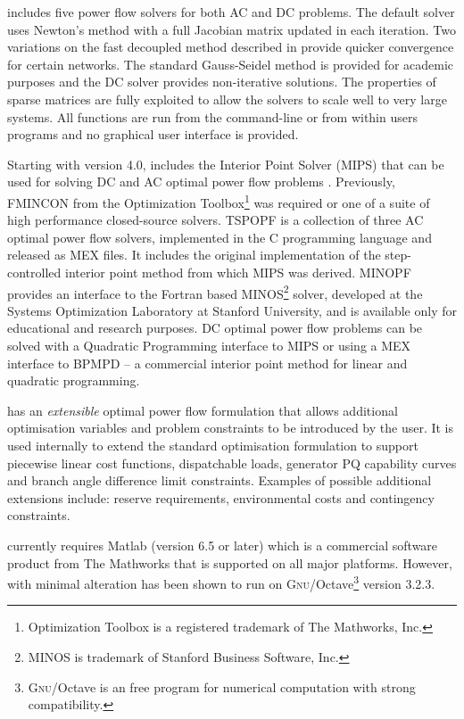 \matpower includes five power flow solvers for both AC and DC problems.  The
default solver uses Newton's method \cite{tinney:67} with a full Jacobian matrix
updated in each iteration.  Two variations on the fast decoupled method
\cite{stott:74} described in  provide quicker convergence
for certain networks.  The standard Gauss-Seidel method \cite{glimn:57} is provided
for academic purposes and the DC solver provides non-iterative
solutions.  The properties of \matlab sparse matrices are fully exploited to
allow the solvers to scale well to very large systems.  All functions are run
from the \matlab command-line or from within users programs and no graphical
user interface is provided.

Starting with version 4.0, \matpower includes the
\matlab Interior Point Solver (MIPS) that can be used for solving
DC and AC optimal power flow problems \cite{zimmerman:ccv}.  Previously,
FMINCON from the \matlab Optimization Toolbox\footnote{Optimization
Toolbox is a registered trademark of The Mathworks, Inc.} was required or one
of a suite of high performance closed-source solvers.  TSPOPF is a
collection of three AC optimal power flow solvers, implemented in the C
programming language and released as \matlab MEX files.  It includes
the original implementation of the step-controlled interior point method from
which MIPS was derived.  MINOPF provides an interface to the
Fortran based MINOS\footnote{MINOS is trademark of Stanford
Business Software, Inc.} solver, developed at the Systems Optimization
Laboratory at Stanford University, and is available only for educational and
research purposes. DC optimal power flow problems can be solved with
a Quadratic Programming interface to MIPS or using a MEX interface to BPMPD --
a commercial interior point method for linear and quadratic programming.

\matpower has an \textit{extensible} optimal power flow formulation that allows
additional optimisation variables and problem constraints to be introduced by
the user.  It is used internally to extend the standard optimisation
formulation to support piecewise linear cost functions, dispatchable loads,
generator PQ capability curves and branch angle difference limit constraints.
Examples of possible additional extensions include: reserve requirements,
environmental costs and contingency constraints.

\matpower currently requires Matlab (version 6.5 or later) which is a
commercial software product from The Mathworks that is supported on all
major platforms.  However, with minimal alteration \matpower has been shown to
run on \textsc{Gnu}/Octave\footnote{\textsc{Gnu}/Octave is an free program for
numerical computation with strong \matlab compatibility.} version 3.2.3.

